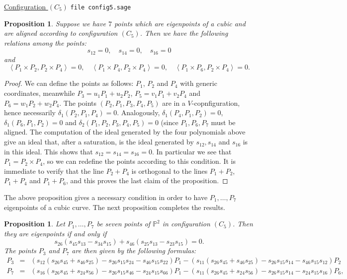 \documentclass{amsart}
\theoremstyle{plain}
\newtheorem{prop}[lemma]{Proposition}
\theoremstyle{definition}
\newcommand{\scl}[2]{\left\langle {#1}, {#2} \right\rangle}
\begin{document}
\underline{Configuration $(C_5)$} 
\verb+file config5.sage+
\begin{prop}
Suppose we have $7$ points which are eigenpoints of a cubic and are
aligned according to configuration $(C_5)$. Then we 
have the following relations among the points:
\[
s_{12} = 0, \quad s_{14} = 0, \quad s_{16} = 0
\]
and
\[
\scl{P_1\times P_2}{P_2\times P_4} = 0, \quad
\scl{P_1\times P_4}{P_2\times P_4} = 0, \quad
\scl{P_1\times P_6}{P_2\times P_4} = 0.
\]
\end{prop}
\begin{proof}
We can define the points as follows: $P_1$, $P_2$ and $P_4$ with generic 
coordinates, meanwhile $P_3 = u_1P_1+u_2P_2$, $P_5 = v_1P_1+v_2P_4$ and
$P_6 = w_1P_2+w_2P_4$. The points $(P_2, P_1, P_3, P_4, P_5)$ are in a
$V$-copnfiguration, hence necessarily $\delta_1(P_2, P_1, P_4)=0$.
Analogously, $\delta_1(P_4, P_1, P_2) = 0$, $\delta_1(P_6, P_1, P_2) = 0$
and $\delta_2(P_1, P_2, P_3, P_4, P_5)=0$ (since $P_1, P_6, P_7$ must
be aligned. The computation of the ideal generated by the four polynomials
above give an ideal that, after a saturation, is the ideal generated by
$s_{12}, s_{14}$ and $s_{16}$ is in this ideal. This shows that
$s_{12} = s_{14}=s_{16}=0$. In particular we see that $P_1 = P_2 \times P_4$,
so we can redefine the points according to this condition. It is
immediate to verify that the line $P_2+P_4$ is orthogonal to the
lines $P_1+P_2$, $P_1+P_4$ and $P_1+P_6$, and this proves the last claim
of the proposition.
\end{proof}
The above proposition gives a necessary condition in order to have
$P_1, \dots, P_7$ eigenpoints of a cubic curve. The next proposition
completes the results.
\begin{prop}
Let $P_1, \dotsc, P_7$ be seven points of $\mathbb{P}^2$ in configuration 
$(C_5)$. Then they are eigenpoints if and only if
\begin{equation}
s_{26}(s_{45}s_{13}-s_{34}s_{15})+s_{46}(s_{25}s_{13}-s_{23}s_{15}) = 0.
\label{cndC5}
\end{equation}
The points $P_3$ and $P_7$ are then given by the following formulas:
\begin{eqnarray}
P_3 & = & (s_{12}(s_{26}s_{45}+s_{46}s_{25})-s_{26}s_{15}s_{24}-s_{46}s_{15}s_{22})P_1-
(s_{11}(s_{26}s_{45}+s_{46}s_{25})-s_{26}s_{15}s_{14}-s_{46}s_{15}s_{12})P_2
\label{p3formula}\\
P_7 & = & (s_{16}(s_{26}s_{45}+s_{24}s_{56})-s_{26}s_{15}s_{46}-s_{24}s_{15}s_{66})P_1-
(s_{11}(s_{26}s_{45}+s_{24}s_{56})-s_{26}s_{15}s_{14}-s_{24}s_{15}s_{16})P_6 ,
\label{p7formula}
\end{eqnarray}
\end{prop}
\end{document}

